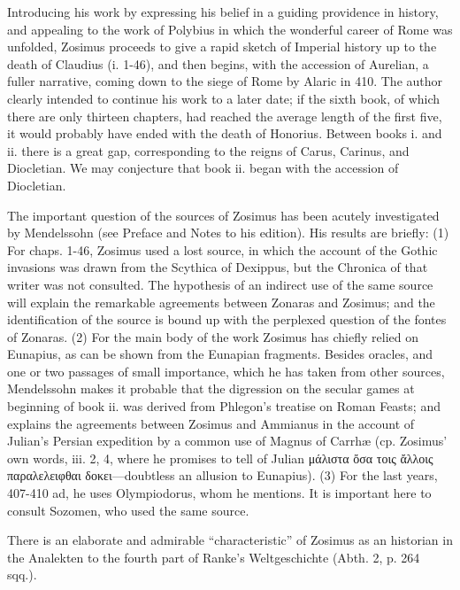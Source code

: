 Introducing his work by expressing his belief in a guiding providence in history, and appealing to the work of Polybius in which the wonderful career of Rome was unfolded, Zosimus proceeds to give a rapid sketch of Imperial history up to the death of Claudius (i. 1-46), and then begins, with the accession of Aurelian, a fuller narrative, coming down to the siege of Rome by Alaric in 410. The author clearly intended to continue his work to a later date; if the sixth book, of which there are only thirteen chapters, had reached the average length of the first five, it would probably have ended with the death of Honorius. Between books i. and ii. there is a great gap, corresponding to the reigns of Carus, Carinus, and Diocletian. We may conjecture that book ii. began with the accession of Diocletian.

The important question of the sources of Zosimus has been acutely investigated by Mendelssohn (see Preface and Notes to his edition). His results are briefly: (1) For chaps. 1-46, Zosimus used a lost source, in which the account of the Gothic invasions was drawn from the Scythica of Dexippus, but the Chronica of that writer was not consulted. The hypothesis of an indirect use of the same source will explain the remarkable agreements between Zonaras and Zosimus; and the identification of the source is bound up with the perplexed question of the fontes of Zonaras. (2) For the main body of the work Zosimus has chiefly relied on Eunapius, as can be shown from the Eunapian fragments. Besides oracles, and one or two passages of small importance, which he has taken from other sources, Mendelssohn makes it probable that the digression on the secular games at beginning of book ii. was derived from Phlegon\texthebrew{}’s treatise on Roman Feasts; and explains the agreements between Zosimus and Ammianus in the account of Julian\texthebrew{}’s Persian expedition by a common use of Magnus of Carrhæ (cp. Zosimus\texthebrew{}’ own words, iii. 2, 4, where he promises to tell of Julian \textgreek{μάλιστα \texthebrew{ὄ}σα τοις \texthebrew{ἄ}λλοις παραλελειφθαι δοκει}\texthebrew{—}doubtless an allusion to Eunapius). (3) For the last years, 407-410 ad, he uses Olympiodorus, whom he mentions. It is important here to consult Sozomen, who used the same source.

There is an elaborate and admirable \texthebrew{“}characteristic\texthebrew{}” of Zosimus as an historian in the Analekten to the fourth part of Ranke\texthebrew{}’s Weltgeschichte (Abth. 2, p. 264 sqq.).


